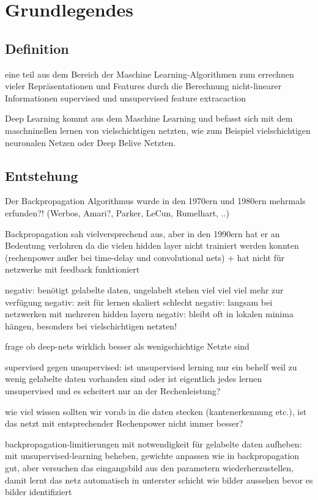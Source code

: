 \chapter{Grundlegendes}
\label{cha:grundlegendes}

\section{Definition}

eine teil aus dem Bereich der Maschine Learning-Algorithmen
zum errechnen vieler Repräsentationen und Features durch die Berechnung nicht-linearer Informationen
supervised und unsupervised feature extracaction


Deep Learning kommt aus dem Maschine Learning und befasst sich mit dem maschninellen lernen von vielschichtigen netzten, wie zum Beispiel vielschichtigen neuronalen Netzen oder Deep Belive Netzten.

\section{Entstehung}

Der Backpropagation Algorithmus wurde in den 1970ern und 1980ern mehrmals erfunden?! (Werbos, Amari?, Parker, LeCun, Rumelhart, ..)

Backpropagation sah vielversprechend aus, aber in den 1990ern hat er an Bedeutung verlohren da die vielen hidden layer nicht trainiert werden konnten (rechenpower außer bei time-delay und convolutional nets) + hat nicht für netzwerke mit feedback funktioniert

negativ: benötigt gelabelte daten, ungelabelt stehen viel viel viel mehr zur verfügung
negativ: zeit für lernen skaliert schlecht
negativ: langsam bei netzwerken mit mehreren hidden layern
negativ: bleibt oft in lokalen minima hängen, besonders bei vielschichtigen netzten!

frage ob deep-nets wirklich besser als wenigschichtige Netzte sind

supervised gegen unsupervised: ist unsupervised lerning nur ein behelf weil zu wenig gelabelte daten vorhanden sind oder ist eigentlich jedes lernen unsupervised und es scheitert nur an der Rechenleistung?

wie viel wissen sollten wir vorab in die daten stecken (kantenerkennung etc.), ist das netzt mit entsprechender Rechenpower nicht immer besser?

backpropagation-limitierungen mit notwendigkeit für gelabelte daten aufheben: mit unsupervised-learning beheben, gewichte anpassen wie in backpropagation gut, aber versuchen das eingangsbild aus den parametern wiederherzustellen, damit lernt das netz automatisch in unterster schicht wie bilder aussehen bevor es bilder identifiziert




